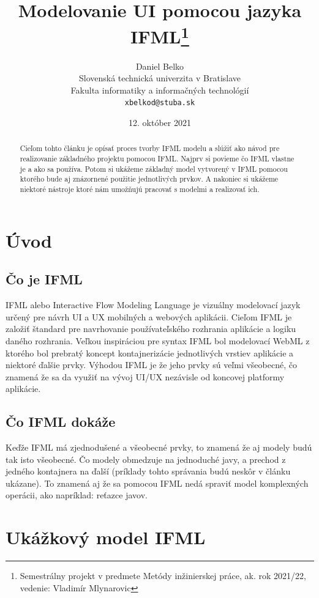 \documentclass[12pt,slovak,a4paper]{article}
\title{Modelovanie UI pomocou jazyka IFML\thanks{Semestrálny projekt v predmete Metódy inžinierskej práce, ak. rok 2021/22, vedenie: Vladimír Mlynarovic}}
\author{Daniel Belko\\[2pt]
	{\small Slovenská technická univerzita v Bratislave}\\
	{\small Fakulta informatiky a informačných technológií}\\
	{\small \texttt{xbelkod@stuba.sk}}
	}
\date{\small 12. október 2021}
\begin{document}
\maketitle

\begin{abstract}

	Cieľom tohto článku je opísať proces tvorby IFML modelu a slúžiť ako návod pre realizovanie základného projektu pomocou IFML. Najprv si povieme čo IFML vlastne je a ako sa používa.  Potom si ukážeme základný model vytvorený v IFML pomocou ktorého bude aj znázornené použitie jednotlivých prvkov. A nakoniec si ukážeme niektoré nástroje ktoré nám umožňujú pracovať s modelmi a realizovať ich.

\end{abstract}

\section{Úvod}

\subsection{Čo je IFML}

IFML alebo Interactive Flow Modeling Language je vizuálny modelovací jazyk určený pre návrh UI a UX mobilných a webových aplikácii. Cieľom IFML je založiť štandard pre navrhovanie používateľského rozhrania aplikácie a logiku daného rozhrania. Veľkou inspiráciou pre syntax IFML bol modelovací WebML z ktorého bol prebratý koncept kontajnerizácie jednotlivých vrstiev aplikácie a niektoré ďalšie prvky. Výhodou IFML je že jeho prvky sú veľmi všeobecné, čo znamená že sa da využiť na vývoj UI/UX nezávisle od koncovej platformy aplikácie.
\cite{BF:IFML}

\subsection{Čo IFML dokáže}

Keďže IFML má zjednodušené a všeobecné prvky, to znamená že aj modely budú tak isto všeobecné. Čo modely obmedzuje na jednoduché javy, a prechod z jedného kontajnera na ďalší (príklady tohto správania budú neskôr v článku ukázane). To znamená aj že sa pomocou IFML nedá spraviť model komplexných operácii, ako napríklad: reťazce javov.
\cite{MB:Intro}

\clearpage

\section{Ukážkový model IFML}
\end{document}
